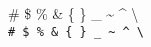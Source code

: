 \documentclass[UTF8]{ctexart}
\begin{document}
\begin{center}
    \#
    \$
    \%
    \&
    \{
    \}
    \_
    \~{}
    \^{}
    \textbackslash \\
    \verb!# $ % & { } _ ~ ^ \!
\end{center}
\end{document}

